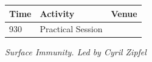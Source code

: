 \documentclass[12pt,]{book}
\theoremstyle{definition}
\theoremstyle{definition}
\theoremstyle{remark}
\begin{document}
\begin{longtable}[]{@{}lll@{}}
\toprule
\begin{minipage}[b]{0.09\columnwidth}\raggedright\strut
Time\strut
\end{minipage} & \begin{minipage}[b]{0.23\columnwidth}\raggedright\strut
Activity\strut
\end{minipage} & \begin{minipage}[b]{0.09\columnwidth}\raggedright\strut
Venue\strut
\end{minipage}\tabularnewline
\midrule
\endhead
\begin{minipage}[t]{0.09\columnwidth}\raggedright\strut
930\strut
\end{minipage} & \begin{minipage}[t]{0.23\columnwidth}\raggedright\strut
Practical Session\strut
\end{minipage} & \begin{minipage}[t]{0.09\columnwidth}\raggedright\strut
\strut
\end{minipage}\tabularnewline
\bottomrule
\end{longtable}

\emph{Surface Immunity. Led by Cyril Zipfel}
\end{document}
